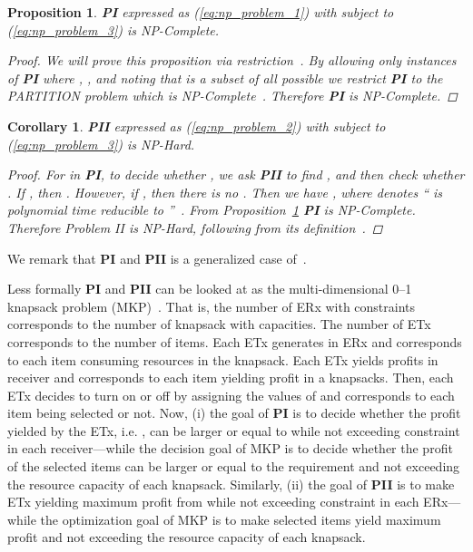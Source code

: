 \documentclass[11pt,draftclsnofoot,journal,onecolumn]{IEEEtran}
\newtheorem{proposition}{Proposition}
\newtheorem{corollary}{Corollary}
\begin{document}
\begin{proposition}
\textbf{PI} expressed as (\ref{eq:np_problem_1}) with subject to (\ref{eq:np_problem_3}) is NP-Complete. 
\begin{proof}
We will prove this proposition via restriction~\cite[Sec. 3.2.1]{Garey:1979:bell}. By allowing only instances of \textbf{PI} where , ,  and noting that  is a subset of all possible  we restrict \textbf{PI} to the PARTITION problem which is NP-Complete~\cite[Sec. 3.1]{Garey:1979:bell}. Therefore \textbf{PI} is NP-Complete.
\end{proof}
\label{theo:np-complete}
\end{proposition}
\begin{corollary}
\textbf{PII} expressed as (\ref{eq:np_problem_2}) with subject to (\ref{eq:np_problem_3}) is NP-Hard. 
\begin{proof}
For  in \textbf{PI}, to decide whether , we ask \textbf{PII} to find , and then check whether . If , then . However, if , then there is no . Then we have , where  denotes `` is polynomial time reducible to ''~\cite[Sec. 8.1]{kleinberg:2005:algo_design}. From Proposition~\ref{theo:np-complete} \textbf{PI} is NP-Complete. Therefore Problem II is NP-Hard, following from its definition~\cite[pp. 80]{leeuwen:1990:handbook}.
\end{proof}
\label{theo:np-hard}
\end{corollary}
We remark that \textbf{PI} and \textbf{PII} is a generalized case of~\cite[(3)]{dai_infocom_2014}.

Less formally \textbf{PI} and \textbf{PII} can be looked at as the multi-dimensional 0--1 knapsack problem (MKP)~\cite{freville2004multidimensional}. That is, the number of ERx  with constraints  corresponds to the number of knapsack with capacities. The number of ETx  corresponds to the number of items. Each ETx  generates  in ERx  and corresponds to each item consuming resources in the knapsack. Each ETx  yields  profits in receiver  and corresponds to each item yielding profit in a knapsacks. Then, each ETx decides to turn on or off by assigning the values of  and corresponds to each item being selected or not. Now, (i) the goal of \textbf{PI} is to decide whether the profit yielded by the ETx, i.e. , can be larger or equal to  while not exceeding constraint  in each receiver---while the decision goal of MKP is to decide whether the profit of the selected items can be larger or equal to the requirement and not exceeding the resource capacity of each knapsack. Similarly, (ii) the goal of \textbf{PII} is to make ETx yielding maximum profit from  while not exceeding constraint  in each ERx---while the optimization goal of MKP is to make selected items yield maximum profit and not exceeding the resource capacity of each knapsack.
\end{document}
